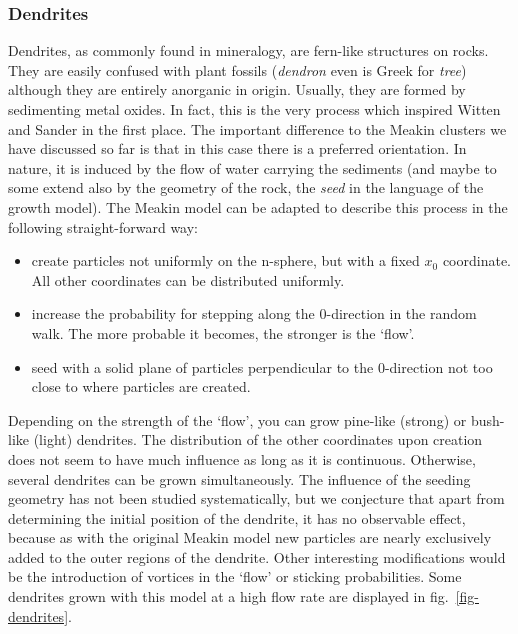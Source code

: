 \documentclass[twocolumn,10pt]{scrartcl}
\begin{document}
            \subsubsection{Dendrites}
                Dendrites, as commonly found in mineralogy, are fern-like structures on rocks. They are easily confused
                with plant fossils (\emph{dendron} even is Greek for \emph{tree}) although they are entirely anorganic
                in origin. Usually, they are formed by sedimenting metal oxides. In fact, this is the very process
                which inspired Witten and Sander in the first place. The important difference to the Meakin clusters
                we have discussed so far is that in this case there is a preferred orientation. In nature, it is
                induced by the flow of water carrying the sediments (and maybe to some extend also by the geometry
                of the rock, the \emph{seed} in the language of the growth model). The Meakin model can be adapted
                to describe this process in the following straight-forward way:
                \begin{itemize}
                    \item create particles not uniformly on the n-sphere, but with a fixed $x_0$ coordinate. All other
                        coordinates can be distributed uniformly.
                    \item increase the probability for stepping along the 0-direction in the random walk. The more
                        probable it becomes, the stronger is the `flow'.
                    \item seed with a solid plane of particles perpendicular to the 0-direction not too close to where
                        particles are created.
                \end{itemize}
                Depending on the strength of the `flow', you can grow pine-like (strong) or bush-like (light) dendrites.
                The distribution of the other coordinates upon creation does not seem to have much influence as long
                as it is continuous. Otherwise, several dendrites can be grown simultaneously. The influence of the
                seeding geometry has not been studied systematically, but we conjecture that apart from determining the
                initial position of the dendrite, it has no observable effect, because as with the original Meakin model
                new particles are nearly exclusively added to the outer regions of the dendrite. Other interesting
                modifications would be the introduction of vortices in the `flow' or sticking probabilities.
                Some dendrites grown with this model at a high flow rate are displayed in fig.~\ref{fig-dendrites}.
\end{document}
